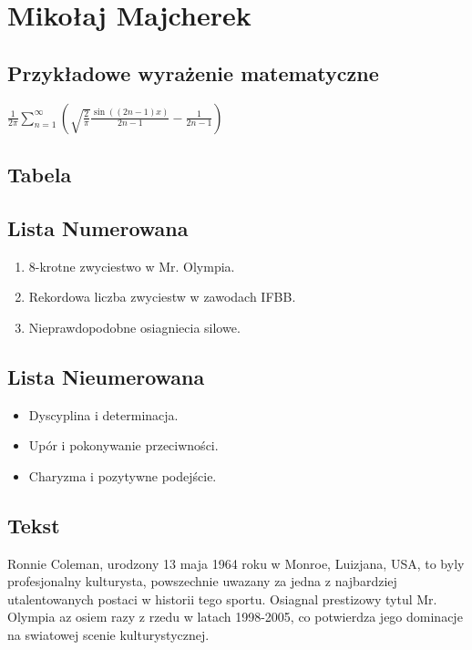 \section{Mikołaj Majcherek}
\subsection{Przykładowe wyrażenie matematyczne}

\begin{math}
    \frac{1}{2\pi} \sum_{n=1}^{\infty} \left( \sqrt{\frac{2}{\pi}} \frac{\sin((2n-1)x)}{2n-1} - \frac{1}{2n-1} \right)
\end{math}

\subsection{Tabela}





\subsection{Lista Numerowana}

\begin{enumerate}
    \item 8-krotne zwyciestwo w Mr. Olympia.
    \item Rekordowa liczba zwyciestw w zawodach IFBB.
    \item Nieprawdopodobne osiagniecia silowe.
\end{enumerate}

\subsection{Lista Nieumerowana}

\begin{itemize}
    \item Dyscyplina i determinacja.
    \item Upór i pokonywanie przeciwności.
    \item Charyzma i pozytywne podejście.
\end{itemize}

\subsection{Tekst}

Ronnie Coleman, urodzony 13 maja 1964 roku w Monroe, Luizjana, USA, to byly profesjonalny kulturysta, powszechnie uwazany za jedna z najbardziej utalentowanych postaci w historii tego sportu. Osiagnal prestizowy tytul Mr. Olympia az osiem razy z rzedu w latach 1998-2005, co potwierdza jego dominacje na swiatowej scenie kulturystycznej.

